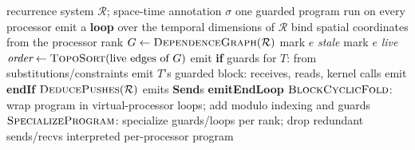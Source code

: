\documentclass[sigplan, nonacm]{acmart}
\begin{document}
\begin{algorithm}[t]
\caption{Compiling recurrence to a distributed program.}
\label{alg:compile}
\begin{algorithmic}[1]
\Require recurrence system $\mathcal{R}$; space-time annotation $\sigma$
\Ensure one guarded program run on every processor
\State emit a \textbf{loop} over the temporal dimensions of $\mathcal{R}$
\State bind spatial coordinates from the processor rank
\State $G \gets \textsc{DependenceGraph}(\mathcal{R})$
    \State mark $e$ \emph{stale} 
  \Else
    \State mark $e$ \emph{live} 
  \EndIf
\EndFor
\State $\textit{order} \gets \textsc{TopoSort}(\text{live edges of } G)$
  \State emit \textbf{if} guards for $T$: from substitutions/constraints
  \State emit $T$'s guarded block: receives, reads, kernel calls
  \State emit \textbf{endIf} 
\EndFor
\State $\textsc{DeducePushes}(\mathcal{R})$ emits \textbf{Send}s
\State \textbf{emitEndLoop} 
 
  \State $\textsc{BlockCyclicFold}$: wrap program in virtual-processor loops; add modulo indexing and guards
\EndIf
\State $\textsc{SpecializeProgram}$: specialize guards/loops per rank; drop redundant sends/recvs 
\State \Return interpreted per-processor program
\end{algorithmic}
\label{fig:algo}
\end{algorithm}

\end{document}
